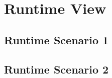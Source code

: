 
\chapter{Runtime View}
\label{chap:Runtime View}


\section{Runtime Scenario 1}
\label{sec:Runtime Scenario 1}


\section{Runtime Scenario 2}
\label{sec:Runtime Scenario 2}
